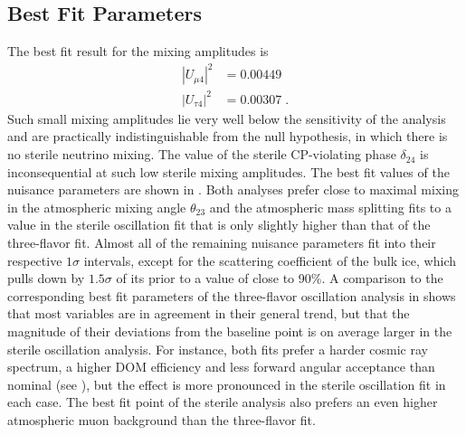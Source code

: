 \subsection{Best Fit Parameters}
The best fit result for the mixing amplitudes is
\begin{align*}
    |U_{\mu 4}|^2  &= 0.00449 \\
    |U_{\tau 4}|^2 &= 0.00307\;.
\end{align*}
Such small mixing amplitudes lie very well below the sensitivity of the analysis and are practically indistinguishable from the null hypothesis, in which there is no sterile neutrino mixing.
The value of the sterile CP-violating phase $\delta_{24}$ is inconsequential at such low sterile mixing amplitudes.
The best fit values of the nuisance parameters are shown in .
Both analyses prefer close to maximal mixing in the atmospheric mixing angle $\theta_{23}$ and the atmospheric mass splitting fits to a value in the sterile oscillation fit that is only slightly higher than that of the three-flavor fit.
Almost all of the remaining nuisance parameters fit into their respective $1\sigma$ intervals, except for the scattering coefficient of the bulk ice, which pulls down by $1.5\sigma$ of its prior to a value of close to 90\%.
A comparison to the corresponding best fit parameters of the three-flavor oscillation analysis in  shows that most variables are in agreement in their general trend, but that the magnitude of their deviations from the baseline point is on average larger in the sterile oscillation analysis.
For instance, both fits prefer a harder cosmic ray spectrum, a higher DOM efficiency and less forward angular acceptance than nominal (see ), but the effect is more pronounced in the sterile oscillation fit in each case.
The best fit point of the sterile analysis also prefers an even higher atmospheric muon background than the three-flavor fit.

